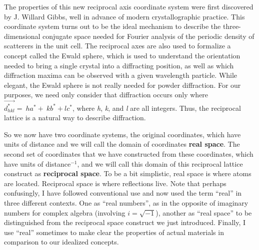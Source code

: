  The properties of this new reciprocal axis coordinate system were first discovered by J. Willard Gibbs, well in advance of modern crystallographic practice. This coordinate system turns out to be the ideal mechanism to describe the three-dimensional conjugate space needed for Fourier analysis of the periodic density of scatterers in the unit cell. The reciprocal axes are also used to formalize a concept called the Ewald sphere, which is used to understand the orientation needed to bring a single crystal into a diffracting position, as well as which diffraction maxima can be observed with a given wavelength particle. While elegant, the Ewald sphere is not really needed for powder diffraction. 
 For our purposes, we need only consider that diffraction occurs only where $\vec{d_{hkl}^\ast}=\ ha^\ast+\ kb^\ast+lc^\ast$, where \textit{h}, \textit{k}, and \textit{l} are all integers.
 Thus, the reciprocal lattice is a natural way to describe diffraction. 

So we now have two coordinate systems, the original coordinates, which have units of distance and we will call the domain of coordinates \textbf{real space}. 
The second set of coordinates that we have constructed from these coordinates, which have units of distance${}^{-1}$, and we will call this domain of this reciprocal lattice construct as \textbf{reciprocal space}. 
To be a bit simplistic, real space is where atoms are located. 
Reciprocal space is where reflections live. 
Note that perhaps confusingly, I have followed conventional use and now used the term ``real'' in three different contexts. One as ``real numbers'', as in the opposite of imaginary numbers for complex algebra (involving $i=\sqrt{-1}$), another as ``real space'' to be distinguished from the reciprocal space construct we just introduced. Finally, I use ``real'' sometimes to make clear the properties of actual materials in comparison to our idealized concepts.

